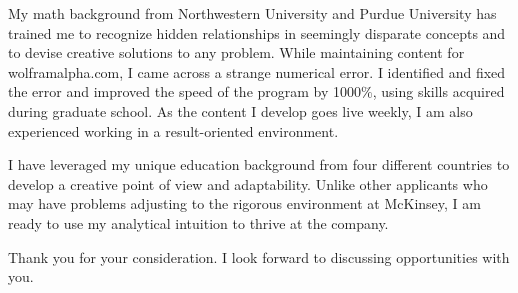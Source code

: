\documentclass[11pt,a4paper,unicode]{moderncv}
\begin{document}
\vspace{3mm}
My math background from Northwestern University and Purdue University has trained me to recognize hidden relationships in seemingly disparate concepts and to devise creative solutions to any problem. While maintaining content for wolframalpha.com, I came across a strange numerical error. I identified and fixed the error and improved the speed of the program by 1000$\%$, using skills acquired during graduate school. As the content I develop goes live weekly, I am also experienced working in a result-oriented environment.

\vspace{3mm}
I have leveraged my unique education background from four different countries to develop a creative point of view and adaptability. Unlike other applicants who may have problems adjusting to the rigorous environment at McKinsey, I am ready to use my analytical intuition to thrive at the company. 

\vspace{3mm}
Thank you for your consideration. I look forward to discussing opportunities with you.

\vspace{3mm}
\makeletterclosing %
\end{document}
